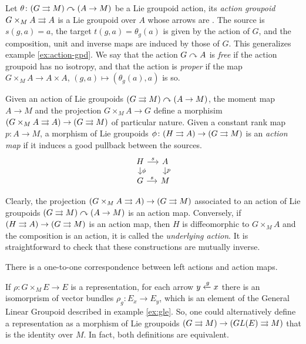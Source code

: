 Let $\theta\colon (G\rightrightarrows M)\curvearrowright (A\to M)$ be a Lie groupoid action, its \emph{action groupoid} \(G\times_M A\rightrightarrows A\) is a Lie groupoid over $A$ whose arrows are .
The source is $s(g,a) = a$, the target $t(g,a) = \theta_g(a)$ is given by the action of $G$, and the composition, unit and inverse maps are induced by those of $G$.
This generalizes example \ref{ex:action-gpd}.
We say that the action $G\curvearrowright A$ is \emph{free} if the action groupoid has no isotropy, and that the action is \emph{proper} if the map $G \times_M A \to A\times A$, $(g,a)\mapsto (\theta_g(a),a)$ is so.

Given an action of Lie groupoids $(G\rightrightarrows M)\curvearrowright (A\to M)$, the moment map $A\to M$ and the projection $G\times_M A\to G$ define a morphisim \((G\times_M A\rightrightarrows A)\to (G\rightrightarrows M)\) of particular nature.
Given a constant rank map $p\colon A\to M$, a morphism of Lie groupoids $\phi\colon(H\rightrightarrows A)\to (G\rightrightarrows M)$ is an \emph{action map} if it induces a good pullback between the sources.
\begin{equation}
\begin{tikzcd}[sep = small]
  H \ar{r}{s} \ar{d}{\phi} & A \ar{d}{p} \\
  G \ar{r}{s} & M
\end{tikzcd}
\end{equation}

Clearly, the projection \((G\times_M A\rightrightarrows A)\to (G\rightrightarrows M)\) associated to an action of Lie groupoids $(G\rightrightarrows M)\curvearrowright (A\to M)$ is an action map.
Conversely, if $(H\rightrightarrows A)\to (G\rightrightarrows M)$ is an action map, then $H$ is diffeomorphic to $G\times_M A$ and the composition  is an action, it is called the \emph{underlying action}.
It is straightforward to check that these constructions are mutually inverse.

\begin{prop}
There is a one-to-one correspondence between left actions and action maps.
\end{prop}

If $\rho\colon G\times_ME\to E$ is a representation, for each arrow $y\xleftarrow g x$ there is an isomorprism of vector bundles $\rho_g\colon E_x\to E_y$, which is an element of the General Linear Groupoid described in example \ref{ex:gle}.
So, one could alternatively define a representation as a morphism of Lie groupoids $(G\rightrightarrows M)\to (GL(E)\rightrightarrows M)$ that is the identity over $M$.
In fact, both definitions are equivalent.

